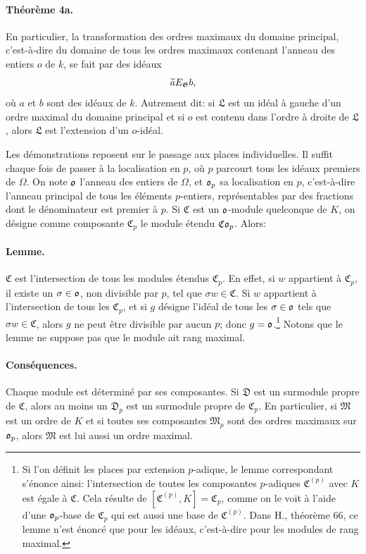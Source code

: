 \paragraph{Théorème 4a.}
En particulier, la transformation des ordres maximaux du domaine principal, c'est-à-dire du domaine de tous les ordres maximaux contenant l'anneau des entiers \(o\) de \(k\), se fait par des idéaux
\[
        \widetilde aE_\mathfrak G b,
\]
où \(a\) et \(b\) sont des idéaux de \(k\). Autrement dit: si \(\mathfrak L\) est un idéal à gauche d'un ordre maximal du domaine principal et si \(o\) est contenu dans l'ordre à droite de \(\mathfrak L\), alors \(\mathfrak L\) est l'extension d'un \(o\)-idéal.

Les démonstrations reposent sur le passage aux places individuelles. Il suffit chaque fois de passer à la localisation en \(p\), où \(p\) parcourt tous les idéaux premiers de \(\Omega\). On note \(\mathfrak o\) l'anneau des entiers de \(\Omega\), et \(\mathfrak o_p\) sa localisation en \(p\), c'est-à-dire l'anneau principal de tous les éléments \(p\)-entiers, représentables par des fractions dont le dénominateur est premier à \(p\). Si \(\mathfrak C\) est un \(\mathfrak o\)-module quelconque de \(K\), on désigne comme composante \(\mathfrak C_p\) le module étendu \(\mathfrak C\mathfrak o_p\). Alors:

\paragraph{Lemme.}
\(\mathfrak C\) est l'intersection de tous les modules étendus \(\mathfrak C_p\). En effet, si \(w\) appartient à \(\mathfrak C_p\), il existe un \(\sigma\in\mathfrak o\), non divisible par \(p\), tel que \(\sigma w\in\mathfrak C\). Si \(w\) appartient à l'intersection de tous les \(\mathfrak C_p\), et si \(g\) désigne l'idéal de tous les \(\sigma\in\mathfrak o\) tels que \(\sigma w\in\mathfrak C\), alors \(g\) ne peut être divisible par aucun \(p\); donc \(g=\mathfrak o\).\footnote{Si l'on définit les places par extension \(p\)-adique, le lemme correspondant s'énonce ainsi: l'intersection de toutes les composantes \(p\)-adiques \(\mathfrak C^{(p)}\) avec \(K\) est égale à \(\mathfrak C\). Cela résulte de \([\mathfrak C^{(p)},K]=\mathfrak C_p\), comme on le voit à l'aide d'une \(\mathfrak o_p\)-base de \(\mathfrak C_p\) qui est aussi une base de \(\mathfrak C^{(p)}\). Dans H., théorème 66, ce lemme n'est énoncé que pour les idéaux, c'est-à-dire pour les modules de rang maximal.} Notons que le lemme ne suppose pas que le module ait rang maximal.

\paragraph{Conséquences.}
Chaque module est déterminé par ses composantes. Si \(\mathfrak D\) est un surmodule propre de \(\mathfrak C\), alors au moins un \(\mathfrak D_p\) est un surmodule propre de \(\mathfrak C_p\). En particulier, si \(\mathfrak M\) est un ordre de \(K\) et si toutes ses composantes \(\mathfrak M_p\) sont des ordres maximaux sur \(\mathfrak o_p\), alors \(\mathfrak M\) est lui aussi un ordre maximal.

